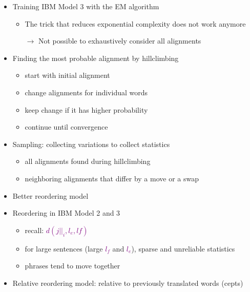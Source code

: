 \documentclass[landscape]{slides}
\newcommand{\maths}[1]{\textcolor{purple}{#1}}
\begin{document}
\begin{itemize}
\item Training IBM Model 3 with the EM algorithm
\begin{itemize}
\item The trick that reduces exponential complexity does not work anymore
\item[$\rightarrow$] Not possible to exhaustively consider all alignments
\end{itemize}
\item Finding the most probable alignment by hillclimbing
\begin{itemize}
\item start with initial alignment
\item change alignments for individual words
\item keep change if it has higher probability
\item continue until convergence
\end{itemize}
\item Sampling: collecting variations to collect statistics
\begin{itemize}
\item all alignments found during hillclimbing
\item neighboring alignments that differ by a move or a swap
\end{itemize}
\end{itemize}
 

\vspace{20mm}
\begin{itemize}
\item Better reordering model
\item Reordering in IBM Model 2 and 3 
\begin{itemize}
\item recall: \maths{$d(j | |_i, l_e , lf )$}
\item for large sentences (large \maths{$l_f$} and  \maths{$l_e$}), sparse and unreliable statistics
\item phrases tend to move together
\end{itemize}
\item Relative reordering model: relative to previously translated words (cepts)
\end{itemize}

\end{document}

